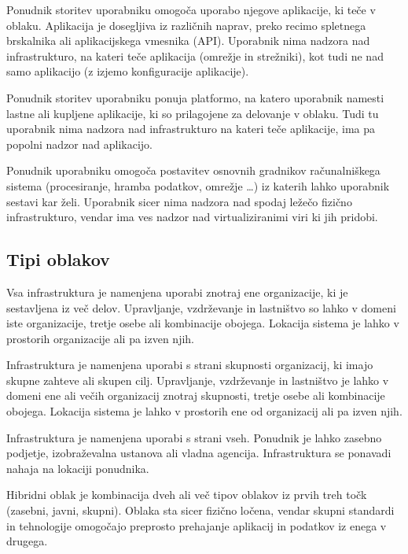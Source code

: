 \documentclass[12pt,a4paper,openany,tikz]{book}
\theoremstyle{plain}
\theoremstyle{definition}
\begin{document}
\begin{description}[style=nextline]
	\item[\gls{SaaS}] Ponudnik storitev uporabniku omogoča uporabo njegove aplikacije, ki teče v oblaku. Aplikacija je dosegljiva iz različnih naprav, preko recimo spletnega brskalnika ali aplikacijskega vmesnika (API). Uporabnik nima nadzora nad infrastrukturo, na kateri teče aplikacija (omrežje in strežniki), kot tudi ne nad samo aplikacijo (z izjemo konfiguracije aplikacije).

	\item[\gls{PaaS}] Ponudnik storitev uporabniku ponuja platformo, na katero uporabnik namesti lastne ali kupljene aplikacije, ki so prilagojene za delovanje v oblaku. Tudi tu uporabnik nima nadzora nad infrastrukturo na kateri teče aplikacije, ima pa popolni nadzor nad aplikacijo.

	\item[\gls{IaaS}] Ponudnik uporabniku omogoča postavitev osnovnih gradnikov računalniškega sistema (procesiranje, hramba podatkov, omrežje …) iz katerih lahko uporabnik sestavi kar želi. Uporabnik sicer nima nadzora nad spodaj ležečo fizično infrastrukturo, vendar ima ves nadzor nad virtualiziranimi viri ki jih pridobi.
\end{description}

\subsection*{Tipi oblakov}
\label{sub:Tipi oblakov}
\begin{description}[style=nextline]
	\item[Zasebni oblak] Vsa infrastruktura je namenjena uporabi znotraj ene organizacije, ki je sestavljena iz več delov. Upravljanje, vzdrževanje in lastništvo so lahko v domeni iste organizacije, tretje osebe ali kombinacije obojega. Lokacija sistema je lahko v prostorih organizacije ali pa izven njih.

	\item[Skupni oblak] Infrastruktura je namenjena uporabi s strani skupnosti organizacij, ki imajo skupne zahteve ali skupen cilj. Upravljanje, vzdrževanje in lastništvo je lahko v domeni ene ali večih organizacij znotraj skupnosti, tretje osebe ali kombinacije obojega. Lokacija sistema je lahko v prostorih ene od organizacij ali pa izven njih.

	\item[Javni oblak] Infrastruktura je namenjena uporabi s strani vseh. Ponudnik je lahko zasebno podjetje, izobraževalna ustanova ali vladna agencija. Infrastruktura se ponavadi nahaja na lokaciji ponudnika.

  \item[Hibridni oblak] Hibridni oblak je kombinacija dveh ali več tipov oblakov iz prvih treh točk (zasebni, javni, skupni). Oblaka sta sicer fizično ločena, vendar skupni standardi in tehnologije omogočajo preprosto prehajanje aplikacij in podatkov iz enega v drugega.
\end{description}
\end{document}

